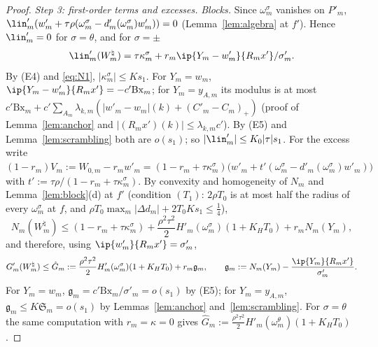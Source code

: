 \begin{proof}
\emph{Step 3: first-order terms and excesses.}
\emph{Blocks.}  Since $\omega^\sigma_m$ vanishes on $P'_m$,
$\lin'_m(w'_m+\tau\rho(\omega^\sigma_m-d'_m(\omega^\sigma_m)w'_m))=0$
(Lemma~\ref{lem:algebra} at $f'$).  Hence $\lin'_m=0$ for $\sigma=\theta$, and
for $\sigma=\pm$
\[
 \lin'_m(W^\natural_m)=\tau\kappa^\sigma_m+r_m\ip{Y_m-w'_m}{R_mx'}/\sigma'_m .
\]
By (E4) and \eqref{eq:N1}, $|\kappa^\sigma_m|\le Ks_1$.  For $Y_m=w_m$,
$\ip{Y_m-w'_m}{R_mx'}=-c'\mathrm{Bx}_m$; for $Y_m=y_{A,m}$ its modulus is at
most $c'\mathrm{Bx}_m+c'\sum_{A_m}\lambda_{k,m}(|w'_m-w_m|(k)+(C'_m-C_m)_+)$
(proof of Lemma~\ref{lem:anchor} and $|(R_mx')(k)|\le\lambda_{k,m}c'$).  By
(E5) and Lemma~\ref{lem:scrambling} both are $o(s_1)$; so
$|\lin'_m|\le K_0|\tau|s_1$.  For the excess write
$(1-r_m)V_m:=W_{0,m}-r_mw'_m=(1-r_m+\tau\kappa^\sigma_m)\big(w'_m+t'
(\omega^\sigma_m-d'_m(\omega^\sigma_m)w'_m)\big)$ with
$t':=\tau\rho/(1-r_m+\tau\kappa^\sigma_m)$.  By convexity and homogeneity of
$N_m$ and Lemma~\ref{lem:block}(d) at $f'$ (condition $(T_1)$: $2\rho T_0$ is
at most half the radius of every $\omega^\sigma_m$ at $f$, and
$\rho T_0\max_m|\Delta d_m|+2T_0Ks_1\le\frac14$),
\[
 N_m(W^\natural_m)\le(1-r_m+\tau\kappa^\sigma_m)+\frac{\rho^2\tau^2}2
 H'_m(\omega^\sigma_m)(1+K_HT_0)+r_mN_m(Y_m),
\]
and therefore, using $\ip{w'_m}{R_mx'}=\sigma'_m$,
\[
 G'_m(W^\natural_m)\le\hat G_m:=\frac{\rho^2\tau^2}2H'_m(\omega^\sigma_m)
 (1+K_HT_0)+r_m\mathfrak g_m,\qquad
 \mathfrak g_m:=N_m(Y_m)-\frac{\ip{Y_m}{R_mx'}}{\sigma'_m}.
\]
For $Y_m=w_m$, $\mathfrak g_m=c'\mathrm{Bx}_m/\sigma'_m=o(s_1)$ by (E5);
for $Y_m=y_{A,m}$, $\mathfrak g_m\le K\mathfrak S_m=o(s_1)$ by
Lemmas~\ref{lem:anchor} and~\ref{lem:scrambling}.  For $\sigma=\theta$ the
same computation with $r_m=\kappa=0$ gives $\hat G_m:=\frac{\rho^2\tau^2}2
H'_m(\omega^\theta_m)(1+K_HT_0)$.


\end{proof}
